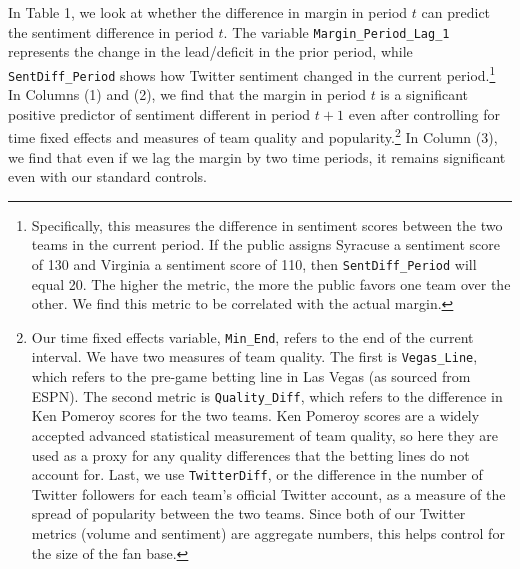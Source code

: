 \documentclass[12pt]{article}
\begin{document}
\begin{doublespacing}
In Table 1, we look at whether the difference in margin in period $t$ can predict the sentiment difference in period $t$. The variable \texttt{Margin\_Period\_Lag\_1} represents the change in the lead/deficit in the prior period, while \texttt{SentDiff\_Period} shows how Twitter sentiment changed in the current period.\footnote{Specifically, this measures the difference in sentiment scores between the two teams in the current period. If the public assigns Syracuse a sentiment score of 130 and Virginia a sentiment score of 110, then \texttt{SentDiff\_Period} will equal 20. The higher the metric, the more the public favors one team over the other. We find this metric to be correlated with the actual margin.} In Columns (1) and (2), we find that the margin in period $t$ is a significant positive predictor of sentiment different in period $t+1$ even after controlling for time fixed effects and measures of team quality and popularity.\footnote{Our time fixed effects variable, \texttt{Min\_End}, refers to the end of the current interval. We have two measures of team quality. The first is \texttt{Vegas\_Line}, which refers to the pre-game betting line in Las Vegas (as sourced from ESPN). The second metric is \texttt{Quality\_Diff}, which refers to the difference in Ken Pomeroy scores for the two teams. Ken Pomeroy scores are a widely accepted advanced statistical measurement of team quality, so here they are used as a proxy for any quality differences that the betting lines do not account for. Last, we use \texttt{TwitterDiff}, or the difference in the number of Twitter followers for each team's official Twitter account, as a measure of the spread of popularity between the two teams. Since both of our Twitter metrics (volume and sentiment) are aggregate numbers, this helps control for the size of the fan base.} In Column (3), we find that even if we lag the margin by two time periods, it remains significant even with our standard controls.


\end{doublespacing}
\end{document}
